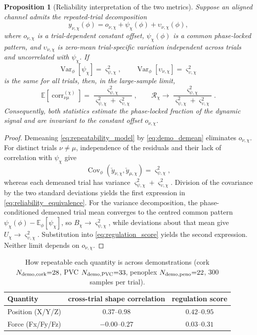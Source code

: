 \documentclass[11pt,a4paper]{article}
\newtheorem{proposition}{Proposition}
\begin{document}
\begin{proposition}[Reliability interpretation of the two metrics]
\label{prop:demo_reliability}
Suppose an aligned channel admits the repeated-trial decomposition
\begin{equation}
y_{\nu,\chi}(\phi)
=o_{\nu,\chi}+\psi_\chi(\phi)+\upsilon_{\nu,\chi}(\phi),
\label{eq:repeatability_model}
\end{equation}
where $o_{\nu,\chi}$ is a trial-dependent constant offset,
$\psi_\chi(\phi)$ is a common phase-locked pattern, and
$\upsilon_{\nu,\chi}$ is zero-mean trial-specific variation independent across
trials and uncorrelated with $\psi_\chi$. If
\[
\operatorname{Var}_\phi[\psi_\chi]=\varsigma_{\psi,\chi}^2,
\qquad
\operatorname{Var}_\phi[\upsilon_{\nu,\chi}]
=\varsigma_{\upsilon,\chi}^2
\]
is the same for all trials, then, in the large-sample limit,
\begin{equation}
\mathbb E\!\left[\operatorname{corr}_{\nu\mu}^{(\chi)}\right]
=\frac{\varsigma_{\psi,\chi}^2}
       {\varsigma_{\psi,\chi}^2+\varsigma_{\upsilon,\chi}^2},
\qquad
\mathcal R_\chi
\longrightarrow
\frac{\varsigma_{\psi,\chi}^2}
     {\varsigma_{\psi,\chi}^2+\varsigma_{\upsilon,\chi}^2}.
\label{eq:reliability_equivalence}
\end{equation}
Consequently, both statistics estimate the phase-locked fraction of the dynamic
signal and are invariant to the constant offset $o_{\nu,\chi}$.
\end{proposition}
\begin{proof}
Demeaning \eqref{eq:repeatability_model} by
\eqref{eq:demo_demean} eliminates $o_{\nu,\chi}$. For distinct trials
$\nu\ne\mu$, independence of the residuals and their lack of correlation with
$\psi_\chi$ give
\[
\operatorname{Cov}_\phi
(\breve y_{\nu,\chi},\breve y_{\mu,\chi})
=\varsigma_{\psi,\chi}^2 ,
\]
whereas each demeaned trial has variance
$\varsigma_{\psi,\chi}^2+\varsigma_{\upsilon,\chi}^2$. Division of the
covariance by the two standard deviations yields the first expression in
\eqref{eq:reliability_equivalence}. For the variance decomposition,
the phase-conditioned demeaned trial mean converges to the centred common
pattern $\psi_\chi(\phi)-\mathbb E_\phi[\psi_\chi]$, so
$B_\chi\rightarrow\varsigma_{\psi,\chi}^2$, while deviations about that mean
give $U_\chi\rightarrow\varsigma_{\upsilon,\chi}^2$. Substitution into
\eqref{eq:regulation_score} yields the second expression. Neither limit depends
on $o_{\nu,\chi}$.
\end{proof}

\begin{table}[h]
\centering
\begin{tabular}{lcc}
\toprule
Quantity & cross-trial shape correlation & regulation score \\
\midrule
Position (X/Y/Z) & $0.37$--$0.98$ & $0.42$--$0.95$ \\
Force (Fx/Fy/Fz) & $-0.00$--$0.27$ & $0.03$--$0.31$ \\
\bottomrule
\end{tabular}
\caption{How repeatable each quantity is across demonstrations
(cork $N_{\rm demo,cork}{=}28$, PVC $N_{\rm demo,PVC}{=}33$,
penoplex $N_{\rm demo,peno}{=}22$, $300$ samples per trial).}
\label{tab:repro}
\end{table}
\end{document}
